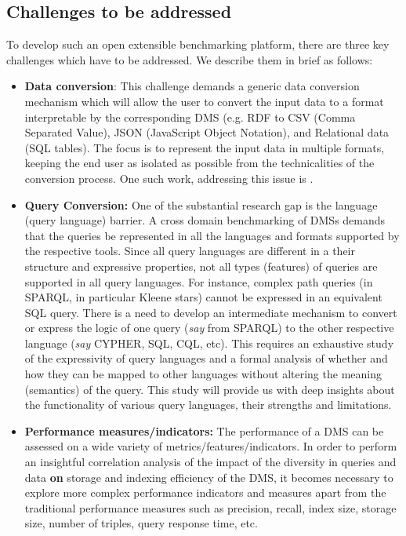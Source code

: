 \documentclass{llncs}
\begin{document}
    \subsection{Challenges to be addressed}\label{challenges}
        To develop such an open extensible benchmarking platform, there are three key challenges which have to be addressed. We describe them in brief as follows:
        \begin{itemize}[nosep]
            \item {} \textbf{Data conversion}: This challenge demands a generic data conversion mechanism which will allow the user to convert the input data to a format interpretable by the corresponding DMS (e.g. RDF to CSV (Comma Separated Value), JSON (JavaScript Object Notation),  and Relational data (SQL tables). The focus is to represent the input data in multiple formats, keeping the end user as isolated as possible from the technicalities of the conversion process. One such work, addressing this issue is \cite{attardexconquer}.
            \item {} \textbf{Query Conversion:} 
            One of the substantial research gap is the language (query language) barrier. A cross domain benchmarking of DMSs demands that the queries be represented in all the languages and formats supported by the respective tools. Since all query languages are different in a their structure and expressive properties, not all types (features) of queries are supported in all query languages. For instance, complex path queries (in SPARQL, in particular Kleene stars) cannot be expressed in an equivalent SQL query. There is a need to develop an intermediate mechanism to convert or express the logic of one query (\textit{say} from SPARQL) to the other respective language (\textit{say} CYPHER, SQL, CQL, etc). This requires an exhaustive study of the expressivity of query languages and a formal analysis of whether and how they can be mapped to other languages without altering the meaning (semantics) of the query. This study will provide us with deep insights about the functionality of various query languages, their strengths and limitations.
            \item {} \textbf{Performance measures/indicators:} 
            The performance of a DMS can be assessed on a wide variety of metrics/features/indicators. In order to perform an insightful correlation analysis of the impact of the diversity in queries and data \textbf{on} storage and indexing efficiency of the DMS, it becomes necessary to explore more complex performance indicators and measures apart from the traditional performance measures such as precision, recall, index size, storage size, number of triples, query response time, etc.
        \end{itemize}
    
\end{document}
